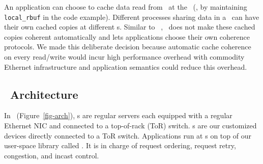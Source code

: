 An application can choose to cache data read from \Cliosysread\ at the \CN\ (\eg, by maintaining \texttt{local\_rbuf} in the code example).
Different processes sharing data in a \rspace\ can have their own cached copies at different \CN{}s.
Similar to ~\cite{Shan18-OSDI}, \sys\ does not make these cached copies coherent automatically and lets applications choose their own coherence
protocols.
We made this deliberate decision because automatic cache coherence on every read/write would incur  high performance overhead with commodity Ethernet infrastructure
and application semantics could reduce this overhead.


\subsection{\sys\ Architecture}

In \sys\ (Figure~\ref{fig-arch}), \CN{}s are regular servers each equipped with a regular Ethernet NIC and connected to a top-of-rack (ToR) switch.
\MN{}s are our customized devices directly connected to a ToR switch.
%
Applications run at \CN{}s on top of our user-space library called {\em \syslib}.
It is in charge of request ordering, request retry, congestion, and incast control. 

